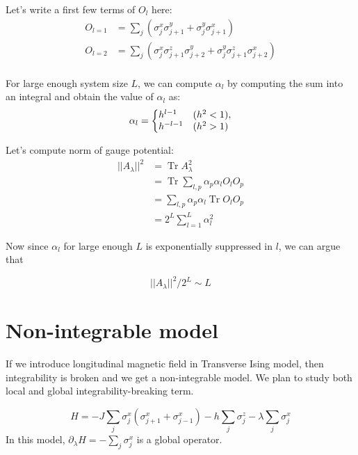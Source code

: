 \documentclass[11pt,a4paper]{article}
\DeclareMathOperator{\Tr}{Tr}
\begin{document}
Let's write a first few terms of $O_l$ here:
\begin{align*}
O_{l=1}&=  \sum_j ( \sigma_j^x  \sigma_{j+1}^y +  \sigma_j^y  \sigma_{j+1}^x) \\
O_{l=2} &=  \sum_j ( \sigma_j^x \sigma_{j+1}^z \sigma_{j+2}^y +  \sigma_j^y \sigma_{j+1}^z \sigma_{j+2}^x) \\
\end{align*}


For large enough system size $L$, we can compute $\alpha_l$ \cite{kolodrubetz2016geometry} by computing the sum into an integral and obtain the value of $\alpha_l$ as: 
\begin{equation}
 \alpha_l=\left\{
  \begin{array}{@{}ll@{}}
    h^{l-1} & (h^2 <1), \\
     h^{-l-1} & (h^2 >1)
  \end{array}\right.
\end{equation}



Let's compute norm of gauge potential:
\begin{align}
||A_{\lambda}||^2 &= \Tr  A_{\lambda}^2 \\
&= \Tr \sum_{l,p}  \alpha_p \alpha_l O_l  O_p\\
&=  \sum_{l,p}  \alpha_p \alpha_l  \Tr O_l  O_p\\
&=  2^L \sum_{l=1}^{L}  \alpha_l ^2
\end{align}


Now since $\alpha_l$ for large enough $L$ is exponentially suppressed in $l$, we can argue that


\begin{equation}
\boxed{||A_{\lambda}||^2 / 2^L \sim  L }
\end{equation}

\section{Non-integrable model}

If we introduce longitudinal magnetic field in Transverse Ising model, then integrability is broken and we get a non-integrable model. We plan to study both local  and global integrability-breaking term. 

\begin{equation}
H= -J \sum_{j} \sigma_j^x (\sigma_{j+1}^x+ \sigma_{j-1}^x) - h\sum_{j} \sigma_j^z -\lambda \sum_{j} \sigma_j^x 
\end{equation}
In this model, $\partial_{\lambda}H = - \sum_{j} \sigma_j^x  $ is a global operator.
\end{document}

